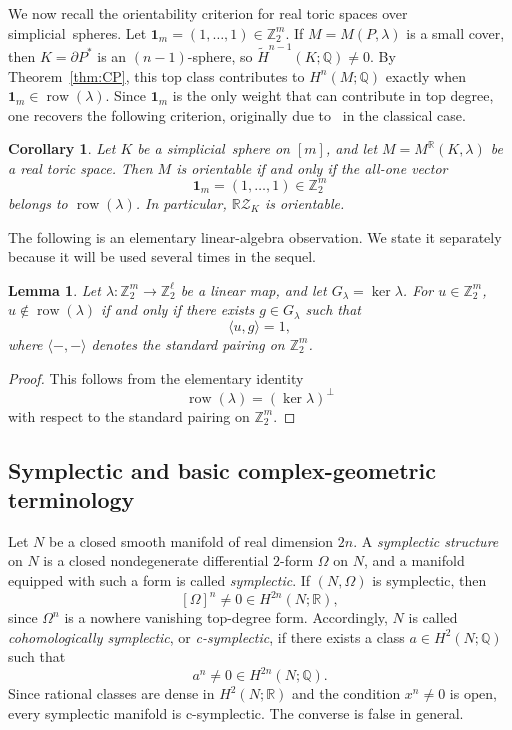 \documentclass{amsart}
\newtheorem{lemma}[theorem]{Lemma}
\newtheorem{corollary}[theorem]{Corollary}
\numberwithin{equation}{section}
\theoremstyle{definition}
\theoremstyle{remark}
\newcommand{\Z}{\mathbb Z}
\newcommand{\R}{\mathbb R}
\newcommand{\Q}{\mathbb Q}
\newcommand{\RZ}{\mathbb R\mathcal Z}
\newcommand{\one}{\mathbf 1}
\DeclareMathOperator{\row}{row}
\begin{document}
We now recall the orientability criterion for real toric spaces over simplicial~spheres.
Let $\one_m=(1,\dots,1)\in \Z_2^m$.
If $M=M(P,\lambda)$ is a small cover, then $K=\partial P^\ast$ is an $(n-1)$-sphere, so $\widetilde H^{n-1}(K;\Q)\ne 0$.
By Theorem~\ref{thm:CP}, this top class contributes to $H^n(M;\Q)$ exactly when $\one_m\in \row(\lambda)$.
Since $\one_m$ is the only weight that can contribute in top degree, one recovers the following criterion, originally due to~\cite{Nakayama-Nishimura2005} in the classical case.

\begin{corollary}\label{cor:NN}
    Let $K$ be a simplicial~sphere on $[m]$, and let $M = M^\R(K,\lambda)$ be a real toric space.
    Then $M$ is orientable if and only if the all-one vector
    $$
        \one_m=(1,\dots,1) \in \Z_2^m
    $$
    belongs to $\row(\lambda)$.
    In particular, $\RZ_K$ is orientable.
\end{corollary}

The following is an elementary linear-algebra observation.
We state it separately because it will be used several times in the sequel.

\begin{lemma}\label{lem:row-kernel-duality}
    Let $\lambda\colon \Z_2^m\to \Z_2^\ell$ be a linear map, and let $G_\lambda=\ker\lambda$.
    For $u\in \Z_2^m$, $u \not\in \row(\lambda)$ if and only if there exists $g \in G_\lambda$ such that 
    $$
        \langle u, g \rangle=1,
    $$
    where $\langle-,-\rangle$ denotes the standard pairing on $\Z_2^m$.
\end{lemma}
\begin{proof}
    This follows from the elementary identity
    $$
        \row(\lambda)=(\ker\lambda)^\perp
    $$
    with respect to the standard pairing on $\Z_2^m$.
\end{proof}


\subsection{Symplectic and basic complex-geometric terminology}
Let $N$ be a closed smooth manifold of real dimension $2n$.
A \emph{symplectic structure} on $N$ is a closed nondegenerate differential $2$-form $\Omega$ on $N$, and a manifold equipped with such a form is called
\emph{symplectic}.
If $(N,\Omega)$ is symplectic, then
$$
    [\Omega]^n\neq 0\in H^{2n}(N;\R),
$$
since $\Omega^n$ is a nowhere vanishing top-degree form.
Accordingly, $N$ is called \emph{cohomologically symplectic}, or \emph{c-symplectic}, if there exists a class $a\in H^2(N;\Q)$ such that
$$
    a^n\neq 0\in H^{2n}(N;\Q).
$$
Since rational classes are dense in $H^2(N;\R)$ and the condition $x^n\neq 0$ is open, every symplectic manifold is c-symplectic.
The converse is false in general. 
\end{document}
